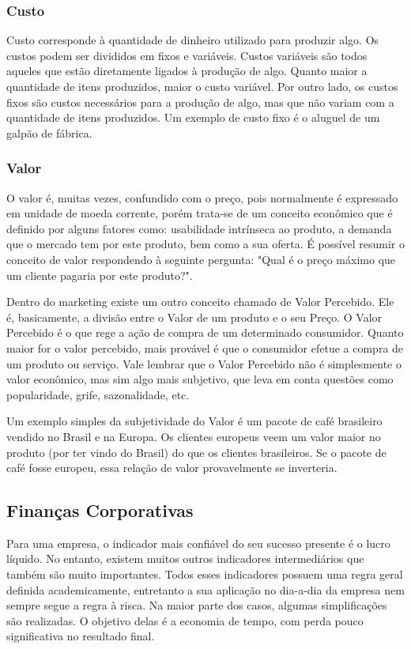 \documentclass[12pt]{article}
\begin{document}
\subsubsection{Custo}

	Custo corresponde à quantidade de dinheiro utilizado para produzir algo. Os custos podem ser divididos em fixos e variáveis. Custos variáveis são todos aqueles que estão diretamente ligados à produção de algo. Quanto maior a quantidade de itens produzidos, maior o custo variável. Por outro lado, os custos fixos são custos necessários para a produção de algo, mas que não variam com a quantidade de itens produzidos. Um exemplo de custo fixo é o aluguel de um galpão de fábrica.

\subsubsection{Valor}

	O valor é, muitas vezes, confundido com o preço, pois normalmente é expressado em unidade de moeda corrente, porém trata-se de um conceito econômico que é definido por alguns fatores como: usabilidade intrínseca ao produto, a demanda que o mercado tem por este produto, bem como a sua oferta. É possível resumir o conceito de valor respondendo à seguinte pergunta: "Qual é o preço máximo que um cliente pagaria por este produto?".

	Dentro do marketing existe um outro conceito chamado de Valor Percebido. Ele é, basicamente, a divisão entre o Valor de um produto e o seu Preço. O Valor Percebido é o que rege a ação de compra de um determinado consumidor. Quanto maior for o valor percebido, mais provável é que o consumidor efetue a compra de um produto ou serviço. Vale lembrar que o Valor Percebido não é simplesmente o valor econômico, mas sim algo mais subjetivo, que leva em conta questões como popularidade, grife, sazonalidade, etc.

	Um exemplo simples da subjetividade do Valor é um pacote de café brasileiro vendido no Brasil e na Europa. Os clientes europeus veem um valor maior no produto (por ter vindo do Brasil) do que os clientes brasileiros. Se o pacote de café fosse europeu, essa relação de valor provavelmente se inverteria.

\subsection{Finanças Corporativas}

	Para uma empresa, o indicador mais confiável do seu sucesso presente é o lucro líquido. No entanto, existem muitos outros indicadores intermediários que também são muito importantes. Todos esses indicadores possuem uma regra geral definida academicamente, entretanto a sua aplicação no dia-a-dia da empresa nem sempre segue a regra à risca. Na maior parte dos casos, algumas simplificações são realizadas. O objetivo delas é a economia de tempo, com perda pouco significativa no resultado final.
\end{document}
